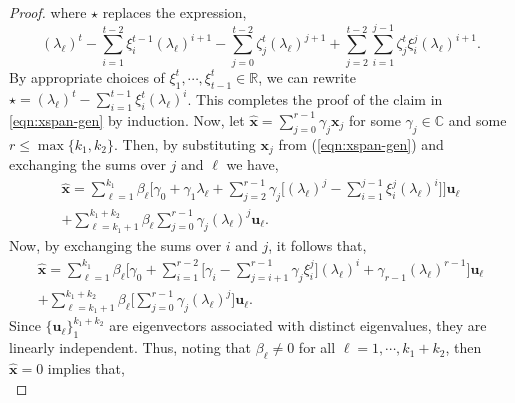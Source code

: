 \documentclass[journal]{IEEEtran}
\theoremstyle{definition}
\theoremstyle{remark}
\newcommand\x{{\bm x}}
\def\u{{\bm u}}
\begin{document}
\begin{proof}
    where $\star$ replaces the expression,
    \begin{equation*}
         (\lambda_\ell)^{t}  -  \sum_{i=1}^{t-2} \xi^{t-1}_{i}  (\lambda_\ell)^{i+1} - \sum_{j=0}^{t-2} \zeta_j^t(\lambda_\ell)^{j+1}+ \sum_{j=2}^{t-2} \sum_{i=1}^{j-1} \zeta_j^t \xi^{j}_{i}  (\lambda_\ell)^{i+1}.
     \end{equation*}
    By appropriate choices of $ \xi^t_{1}, \cdots, \xi^t_{t-1} \in \mathbb{R}$, we can rewrite $\star = (\lambda_\ell)^{t} -  \sum_{i=1}^{t-1} \xi^{t}_{i}  (\lambda_\ell)^i $.
    This completes the proof of the claim in \cref{eqn:xspan-gen} by induction. 
    Now, let $\widehat{\x} = \sum_{j= 0}^{r-1} \gamma_j \x_j$ for some $\gamma_j \in \mathbb{C}$ and some $r\leq \max\{k_1,k_2\}$.
    Then, by substituting $\x_j$ from (\ref{eqn:xspan-gen}) and exchanging the sums over $j$ and $\ell$ we have, 
    \begin{gather*}
    	\textstyle \widehat{\x} =
    	\sum_{\ell=1}^{k_1}  \beta_\ell \Big[\gamma_0  + \gamma_1 \lambda_\ell + \sum_{j=2}^{r-1} \gamma_j\big[ (\lambda_\ell)^j   -  \sum_{i=1}^{j-1} \xi^{j}_{i}  (\lambda_\ell)^i  \big] \Big] \u_\ell \\
    	\textstyle + \sum_{\ell=k_1+1}^{k_1+k_2} \beta_\ell \sum_{j=0}^{r-1} \gamma_j (\lambda_\ell)^j \u_\ell .
    \end{gather*}
    Now, by exchanging the sums over $i$ and $j$, it follows that,
    \begin{gather*}
    \textstyle	\widehat{\x} = \sum_{\ell=1}^{k_1} \beta_\ell  \Big[ \gamma_0 + \sum\limits_{i=1}^{r-2} \big[ \gamma_i - \sum\limits_{j=i+1}^{r-1} \gamma_j \xi_{i}^{j} \big] (\lambda_{\ell})^i + \gamma_{r-1} (\lambda_{\ell})^{r-1} \Big] \u_\ell  \\
     \textstyle   +\sum_{\ell=k_1+1}^{k_1+k_2} \beta_\ell \big[ \sum_{j=0}^{r-1} \gamma_j (\lambda_\ell)^j \big] \u_\ell .
    \end{gather*}
    Since $\{\u_\ell\}_1^{k_1+k_2}$ are eigenvectors associated with distinct eigenvalues, they are linearly independent.
    Thus, noting that $\beta_\ell \neq 0$ for all $\ell = 1, \cdots, k_1+k_2$, then $\widehat{\x}= 0$ implies that,
    \begin{equation*}

\end{equation*}
\end{proof}
\end{document}
